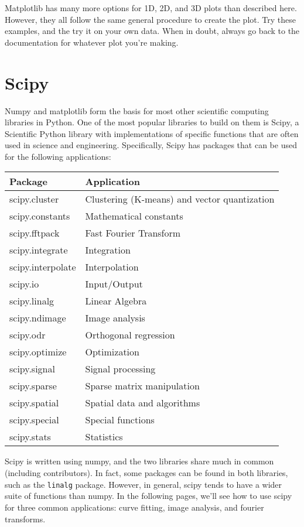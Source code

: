 \documentclass[12pt]{article}
\newcommand{\code}{\texttt}
\begin{document}
Matplotlib has many more options for 1D, 2D, and 3D plots than described here. However, they all follow the same general procedure to create the plot. Try these examples, and the try it on your own data. When in doubt, always go back to the documentation for whatever plot you're making.

\newpage
\section{Scipy}
Numpy and matplotlib form the basis for most other scientific computing libraries in Python. One of the most popular libraries to build on them is Scipy, a Scientific Python library with implementations of specific functions that are often used in science and engineering. Specifically, Scipy has packages that can be used for the following applications:

\begin{tabular}{|p{1.5in}|p{3in}|}
\hline
\textbf{Package} & \textbf{Application} \\ \hline
scipy.cluster & Clustering (K-means) and vector quantization \\ \hline
scipy.constants & Mathematical constants \\ \hline
scipy.fftpack & Fast Fourier Transform \\ \hline
scipy.integrate & Integration \\ \hline
scipy.interpolate & Interpolation \\ \hline
scipy.io & Input/Output \\ \hline
scipy.linalg & Linear Algebra \\ \hline
scipy.ndimage & Image analysis \\ \hline
scipy.odr & Orthogonal regression \\ \hline
scipy.optimize & Optimization \\ \hline
scipy.signal & Signal processing \\ \hline
scipy.sparse & Sparse matrix manipulation \\ \hline
scipy.spatial & Spatial data and algorithms \\ \hline
scipy.special & Special functions \\ \hline
scipy.stats & Statistics \\ \hline
\end{tabular}

Scipy is written using numpy, and the two libraries share much in common (including contributors). In fact, some packages can be found in both libraries, such as the \code{linalg} package. However, in general, scipy tends to have a wider suite of functions than numpy. In the following pages, we'll see how to use scipy for three common applications: curve fitting, image analysis, and fourier transforms.
\end{document}
